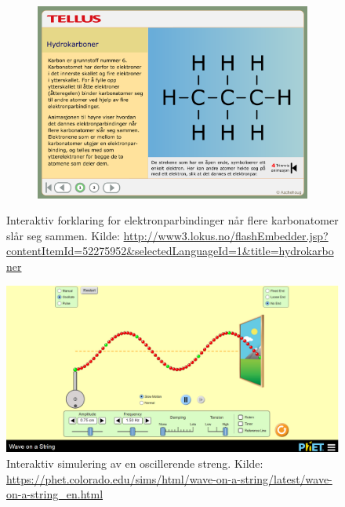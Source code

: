 \documentclass[main.tex]{subfiles}
\begin{document}
\begin{figure}[h!]
\begin{subfigure}{.5\textwidth}
    \end{subfigure}%
    \begin{subfigure}{.5\textwidth}
    \centering
    \includegraphics[scale = 0.199]{../figures/lokus4.png}
    \end{subfigure}
    \caption{Interaktiv forklaring for elektronparbindinger når flere karbonatomer slår seg sammen. Kilde: 
    \protect\url{http://www3.lokus.no/flashEmbedder.jsp?contentItemId=52275952&selectedLanguageId=1&title=hydrokarboner}}
    \label{fig:lokus}
\end{figure}

\begin{figure}[h!]
\centering
\includegraphics[scale = 0.25]{../figures/wave.png}
\caption{Interaktiv simulering av en oscillerende streng. Kilde: 
\protect\url{https://phet.colorado.edu/sims/html/wave-on-a-string/latest/wave-on-a-string_en.html}}
\label{fig:wave}
\end{figure}
\end{document}
